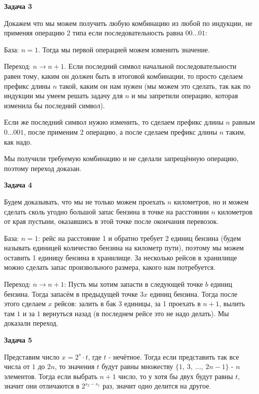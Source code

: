 \begin{center}
\textbf{Задача 3}
\end{center}
Докажем что мы можем получить любую комбинацию из любой по индукции, не применяя операцию 2 типа если последовательность равна $\displaystyle 00...01$:

База: $\displaystyle n=1$. Тогда мы первой операцией можем изменить значение.

Переход: $\displaystyle n\rightarrow n+1$. Если последний символ начальной последовательности равен тому, каким он должен быть в итоговой комбинации, то просто сделаем префикс длины $\displaystyle n$ такой, каким он нам нужен (мы можем это сделать, так как по индукции мы умеем решать задачу для $\displaystyle n$ и мы запретили операцию, которая изменила бы последний символ).

Если же последний символ нужно изменить, то сделаем префикс длины $\displaystyle n$ равным $\displaystyle 0...001$, после применим 2 операцию, а после сделаем префикс длины $\displaystyle n$ таким, как надо.

Мы получили требуемую комбинацию и не сделали запрещённую операцию, поэтому переход доказан.

\begin{center}
\textbf{Задача 4}
\end{center}
Будем доказывать, что мы не только можем проехать $\displaystyle n$ километров, но и можем сделать сколь угодно большой запас бензина в точке на расстоянии $\displaystyle n$ километров от края пустыни, оказавшись в этой точке после окончания перевозок.

База: $\displaystyle n=1$: рейс на расстояние 1 и обратно требует 2 единиц бензина (будем называть единицей количество бензина на километр пути), поэтому мы можем оставить 1 единицу бензина в хранилище. За несколько рейсов в хранилище можно сделать запас произвольного размера, какого нам потребуется.

Переход: $\displaystyle n\rightarrow n+1$: Пусть мы хотим запасти в следующей точке $\displaystyle b$ единиц бензина. Тогда запасём в предыдущей точке $\displaystyle 3x$ единиц бензина. Тогда после этого сделаем $\displaystyle x$ рейсов: залить в бак 3 единицы, за 1 проехать в $\displaystyle n+1$, вылить там $\displaystyle 1$ и за $\displaystyle 1$ вернуться назад (в последнем рейсе это не надо делать). Мы доказали переход.

\begin{center}
\textbf{Задача 5}
\end{center}
Представим число $\displaystyle x=2^{s} \cdotp t$, где $\displaystyle t$ - нечётное. Тогда если представить так все числа от $\displaystyle 1$ до $\displaystyle 2n$, то значения $\displaystyle t$ будут равны множеству $\displaystyle \{1,\ 3,\ ...,\ 2n-1\}$ - $\displaystyle n$ элементов. Тогда если выбрать $\displaystyle n+1$ число, то у хотя бы двух будут равны $\displaystyle t$, значит они отличаются в $\displaystyle 2^{s_{2} -s_{1}}$ раз, значит одно делится на другое.

